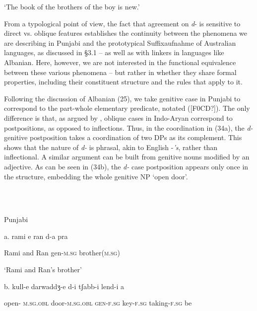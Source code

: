 \documentclass[output=paper]{langsci/langscibook}
\begin{document}
    ‘The book of the brothers of the boy is new.’

From a typological point of view, the fact that agreement on \textit{d}{}- is sensitive to direct vs. oblique features establishes the continuity between the phenomena we are describing in Punjabi and the prototypical Suffixaufnahme of Australian languages, as discussed in §3.1 – as well as with linkers in languages like Albanian. Here, however, we are not interested in the functional equivalence between these various phenomena – but rather in whether they share formal properties, including their constituent structure and the rules that apply to it.    

Following the discussion of Albanian (25), we take genitive case in Punjabi to correspond to the part-whole elementary predicate, notated ([F0CD?]). The only difference is that, as argued by \citet{Payne1995}, oblique cases in Indo-Aryan correspond to postpositions, as opposed to inflections. Thus, in the coordination in (34a), the \textit{d-} genitive postposition takes a coordination of two DPs as its complement. This shows that the nature of \textit{d-} is phrasal, akin to English -\textit{’s}, rather than inflectional. A similar argument can be built from genitive nouns modified by an adjective. As can be seen in (34b), the \textit{d-} case postposition appears only once in the structure, embedding the whole genitive NP ‘open door’.

\ea%
    \label{ex:key:34}
    \gll\\
        \\
    \glt
    \z

          Punjabi

  a.  rami   e   ran   d-a   pra

\begin{styleSfondomedioiColorexi}
     Rami   and  Ran  gen-\textsc{m.sg}  brother\textsc{(m.sg)} 
\end{styleSfondomedioiColorexi}

\begin{styleSfondomedioiColorexi}
‘Rami and Ran’s brother’
\end{styleSfondomedioiColorexi}

\begin{styleSfondomedioiColorexi}
b.  kull-e   darwaddʒ-e  d-i   tʃabb-i   lend-i   a 
\end{styleSfondomedioiColorexi}

\begin{styleSfondomedioiColorexi}
  open- \textsc{m.sg.obl}   door-\textsc{m.sg.obl}  \textsc{gen-f.sg}   key-\textsc{f.sg}  taking-\textsc{f.sg}  be
\end{styleSfondomedioiColorexi}
\end{document}
